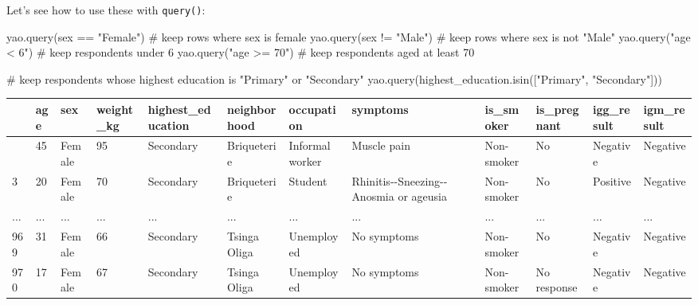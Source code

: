 \documentclass[
  letterpaper,
  DIV=11,
  numbers=noendperiod]{scrreprt}
\newenvironment{Shaded}{\begin{snugshade}}{\end{snugshade}}
\newcommand{\CommentTok}[1]{\textcolor[rgb]{0.37,0.37,0.37}{#1}}
\newcommand{\NormalTok}[1]{\textcolor[rgb]{0.00,0.23,0.31}{#1}}
\newcommand{\StringTok}[1]{\textcolor[rgb]{0.13,0.47,0.30}{#1}}
\begin{document}
Let's see how to use these with \texttt{query()}:

\begin{Shaded}
\begin{Highlighting}[]
\NormalTok{yao.query(}\StringTok{\textquotesingle{}sex == "Female"\textquotesingle{}}\NormalTok{)  }\CommentTok{\# keep rows where \textasciigrave{}sex\textasciigrave{} is female}
\NormalTok{yao.query(}\StringTok{\textquotesingle{}sex != "Male"\textquotesingle{}}\NormalTok{)  }\CommentTok{\# keep rows where \textasciigrave{}sex\textasciigrave{} is not "Male"}
\NormalTok{yao.query(}\StringTok{"age \textless{} 6"}\NormalTok{)  }\CommentTok{\# keep respondents under 6}
\NormalTok{yao.query(}\StringTok{"age \textgreater{}= 70"}\NormalTok{)  }\CommentTok{\# keep respondents aged at least 70}

\CommentTok{\# keep respondents whose highest education is "Primary" or "Secondary"}
\NormalTok{yao.query(}\StringTok{\textquotesingle{}highest\_education.isin(["Primary", "Secondary"])\textquotesingle{}}\NormalTok{)}
\end{Highlighting}
\end{Shaded}

\begin{longtable}[]{@{}llllllllllll@{}}
\toprule\noalign{}
& age & sex & weight\_kg & highest\_education & neighborhood &
occupation & symptoms & is\_smoker & is\_pregnant & igg\_result &
igm\_result \\
\midrule\noalign{}
\endhead
\bottomrule\noalign{}
\endlastfoot
0 & 45 & Female & 95 & Secondary & Briqueterie & Informal worker &
Muscle pain & Non-smoker & No & Negative & Negative \\
3 & 20 & Female & 70 & Secondary & Briqueterie & Student &
Rhinitis-\/-Sneezing-\/-Anosmia or ageusia & Non-smoker & No & Positive
& Negative \\
... & ... & ... & ... & ... & ... & ... & ... & ... & ... & ... & ... \\
969 & 31 & Female & 66 & Secondary & Tsinga Oliga & Unemployed & No
symptoms & Non-smoker & No & Negative & Negative \\
970 & 17 & Female & 67 & Secondary & Tsinga Oliga & Unemployed & No
symptoms & Non-smoker & No response & Negative & Negative \\
\end{longtable}
\end{document}
